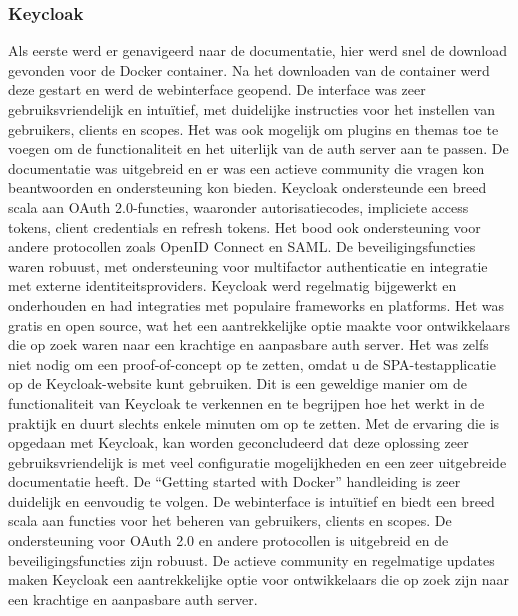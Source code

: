 \subsubsection{Keycloak}%
\label{subsubsec:keycloak}
Als eerste werd er genavigeerd naar de documentatie, hier werd snel de download gevonden voor de Docker container. Na het downloaden van de container werd deze gestart en werd de webinterface geopend. De interface was zeer gebruiksvriendelijk en intuïtief, met duidelijke instructies voor het instellen van gebruikers, clients en scopes. Het was ook mogelijk om plugins en themas toe te voegen om de functionaliteit en het uiterlijk van de auth server aan te passen. De documentatie was uitgebreid en er was een actieve community die vragen kon beantwoorden en ondersteuning kon bieden. Keycloak ondersteunde een breed scala aan OAuth 2.0-functies, waaronder autorisatiecodes, impliciete access tokens, client credentials en refresh tokens. Het bood ook ondersteuning voor andere protocollen zoals OpenID Connect en SAML. De beveiligingsfuncties waren robuust, met ondersteuning voor multifactor authenticatie en integratie met externe identiteitsproviders. Keycloak werd regelmatig bijgewerkt en onderhouden en had integraties met populaire frameworks en platforms. Het was gratis en open source, wat het een aantrekkelijke optie maakte voor ontwikkelaars die op zoek waren naar een krachtige en aanpasbare auth server.
Het was zelfs niet nodig om een proof-of-concept op te zetten, omdat u de SPA-testapplicatie op de Keycloak-website kunt gebruiken. Dit is een geweldige manier om de functionaliteit van Keycloak te verkennen en te begrijpen hoe het werkt in de praktijk en duurt slechts enkele minuten om op te zetten.
Met de ervaring die is opgedaan met Keycloak, kan worden geconcludeerd dat deze oplossing zeer gebruiksvriendelijk is met veel configuratie mogelijkheden en een zeer uitgebreide documentatie heeft. De ``Getting started with Docker'' handleiding is zeer duidelijk en eenvoudig te volgen. De webinterface is intuïtief en biedt een breed scala aan functies voor het beheren van gebruikers, clients en scopes. De ondersteuning voor OAuth 2.0 en andere protocollen is uitgebreid en de beveiligingsfuncties zijn robuust. De actieve community en regelmatige updates maken Keycloak een aantrekkelijke optie voor ontwikkelaars die op zoek zijn naar een krachtige en aanpasbare auth server.

